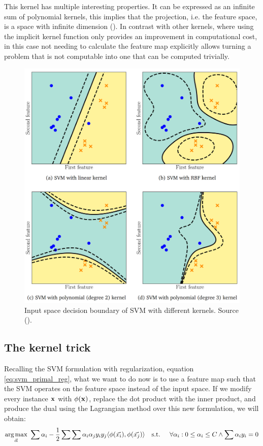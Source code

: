 This kernel has multiple interesting properties. It can be expressed as an infinite sum of polynomial kernels, this implies that the projection, i.e. the feature space, is a space with infinite dimension (\cite{bernstein_radial_2017}). In contrast with other kernels, where using the implicit kernel function only provides an improvement in com\-pu\-ta\-tion\-al cost, in this case not needing to calculate the feature map explicitly allows turning a problem that is not computable into one that can be computed trivially.

\begin{figure}[h]
    \centering
    \includegraphics[width=0.7\linewidth]{img/ch4/kernels.png}
    \caption{Input space decision boundary of SVM with different kernels. Source (\cite{deisenroth_mathematics_2020}).}
    \label{fig:ch4.kernels}
\end{figure}


\subsection{The kernel trick}

Recalling the SVM formulation with regularization, equation \ref{eq:svm_primal_reg}, what we want to do now is to use a feature map such that the SVM operates on the feature space instead of the input space. If we modify every instance $\mathbf{x}$ with $\phi(\mathbf{x})$, replace the dot product with the inner product, and produce the dual using the Lagrangian method over this new formulation, we will obtain:
\begin{align*}
    \underset{\vec{\alpha}}{\text{arg} \max}\ \sum \alpha_i - \frac{1}{2} \sum \sum \alpha_i \alpha_j y_i y_j \langle\phi(\vec{x_i}), \phi(\vec{x_j})\rangle
    \text{\quad s.t. \quad} \forall \alpha_i : 0 \le \alpha_i \le C \land \sum \alpha_i y_i = 0
\end{align*}

